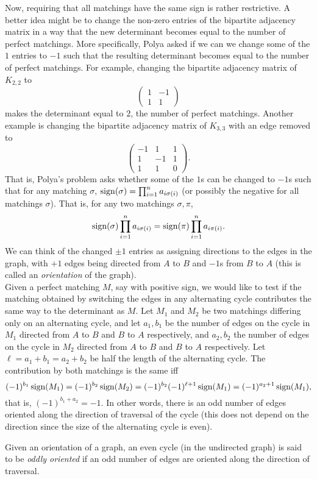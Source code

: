 Now, requiring that all matchings have the same sign is rather restrictive. A better idea might be to change the non-zero entries of the bipartite adjacency matrix in a way that the new determinant becomes equal to the number of perfect matchings. More specifically, Polya asked if we can we change some of the $1$ entries to $-1$ such that the resulting determinant becomes equal to the number of perfect matchings. For example, changing the bipartite adjacency matrix of $K_{2,2}$ to
\[ \begin{pmatrix} 1 & -1 \\ 1 & 1 \end{pmatrix} \]
makes the determinant equal to $2$, the number of perfect matchings. Another example is changing the bipartite adjacency matrix of $K_{3,3}$ with an edge removed to
\[ \begin{pmatrix} -1 & 1 & 1 \\ 1 & -1 & 1 \\ 1 & 1 & 0 \end{pmatrix}. \]
That is, Polya's problem asks whether some of the $1$s can be changed to $-1$s such that for any matching $\sigma$, $\operatorname{sign}(\sigma) = \prod_{i=1}^{n} a_{i\sigma(i)}$ (or possibly the negative for all matchings $\sigma$). That is, for any two matchings $\sigma,\pi$,
\[ \operatorname{sign}(\sigma) \prod_{i=1}^n a_{i \sigma(i)} = \operatorname{sign}(\pi) \prod_{i=1}^n a_{i \pi(i)}. \]
We can think of the changed $\pm 1$ entries as assigning directions to the edges in the graph, with $+1$ edges being directed from $A$ to $B$ and $-1$s from $B$ to $A$ (this is called an \emph{orientation} of the graph). \\
Given a perfect matching $M$, say with positive sign, we would like to test if the matching obtained by switching the edges in any alternating cycle contributes the same way to the determinant as $M$. Let $M_1$ and $M_2$ be two matchings differing only on an alternating cycle, and let $a_1,b_1$ be the number of edges on the cycle in $M_1$ directed from $A$ to $B$ and $B$ to $A$ respectively, and $a_2,b_2$ the number of edges on the cycle in $M_2$ directed from $A$ to $B$ and $B$ to $A$ respectively. Let $\ell = a_1+b_1 = a_2+b_2$ be half the length of the alternating cycle. The contribution by both matchings is the same iff
\[ (-1)^{b_1} \operatorname{sign}(M_1) = (-1)^{b_2} \operatorname{sign}(M_2) = (-1)^{b_2} (-1)^{\ell+1} \operatorname{sign}(M_1) = (-1)^{a_2+1} \operatorname{sign}(M_1), \]
that is, $(-1)^{b_1+a_2} = -1$. In other words, there is an odd number of edges oriented along the direction of traversal of the cycle (this does not depend on the direction since the size of the alternating cycle is even).
\begin{fdef}
	Given an orientation of a graph, an even cycle (in the undirected graph) is said to be \emph{oddly oriented} if an odd number of edges are oriented along the direction of traversal.
\end{fdef}


